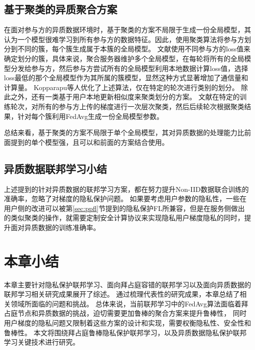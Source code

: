 \subsection{基于聚类的异质聚合方案}
在面对参与方的异质数据环境时，基于聚类的方案不局限于生成一份全局模型，其认为一个模型很难学习到所有参与方的数据特征。因此，使用聚类算法将参与方划分到不同的簇，每个簇生成属于本簇的全局模型。
文献\cite{ghosh2022efficient}使用不同参与方的loss值来确定划分的簇，具体来说，聚合服务器维护多个全局模型，在每轮将所有的全局模型分发给参与方，然后参与方尝试所有的全局模型利用本地数据计算loss值，选择loss最低的那个全局模型作为其所属的簇模型，显然这种方式显著增加了通信量和计算量。
Kopparapu等人\cite{kopparapu2020fedfmc}优化了上述算法，仅在特定的轮次进行类别的划分。
除此之外，还有一类基于用户本地更新相似度来聚类划分的方案\cite{briggs2020federated, sattler2020clustered, dempster1977maximum}。
文献\cite{briggs2020federated}在特定的训练轮次，对所有的参与方上传的梯度进行一次层次聚类，然后后续轮次根据聚类结果，针对每个簇利用FedAvg生成一份全局模型参数。

总结来看，基于聚类的方案不局限于单个全局模型，其对异质数据的处理能力比前面提到的单个模型强，且可以和前面的方案结合使用。

\subsection{异质数据联邦学习小结}
上述提到的针对异质数据的联邦学习方案，都在努力提升Non-IID数据联合训练的准确率，忽略了对梯度的隐私保护问题。
如果要考虑用户参数的隐私性，一些在用户侧的改进可以被第\ref{sec:ppfl}节提到的隐私保护FL所兼容，但是在服务侧做出的类似聚类的操作，就需要定制安全计算协议来实现隐私用户梯度隐私的同时，提升面对异质数据的训练准确率。

\section{本章小结}
本章主要针对隐私保护联邦学习、面向拜占庭容错的联邦学习以及面向异质数据的联邦学习相关研究成果展开了综述。
通过梳理代表性的研究成果，本章总结了相关领域所面临的问题和挑战。
总体来说，当前联邦学习中的FedAvg算法面临着拜占庭节点和异质数据的挑战，迫切需要更加鲁棒的聚合方案来提升鲁棒性，
同时用户梯度的隐私问题又限制着这些方案的设计和实现，需要权衡隐私性、安全性和鲁棒性。
本文将围绕拜占庭鲁棒隐私保护联邦学习，以及异质数据隐私保护联邦学习关键技术进行研究。
